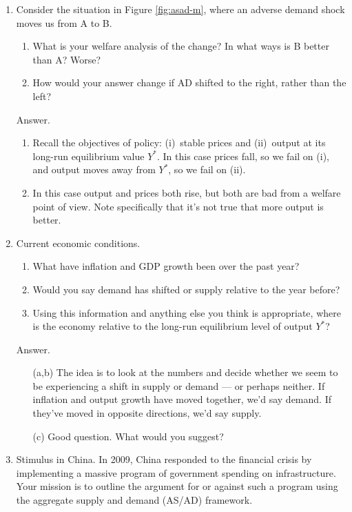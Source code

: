 \setlength{\leftmargini}{.5\oldleftmargini}
\begin{enumerate}
\item Consider the situation in Figure \ref{fig:asad-m},
where an adverse demand shock moves us from A to B.
\begin{enumerate}
\item What is your welfare analysis of the change?
In what ways is B better than A?  Worse?
\item How would your answer change if AD shifted to the right,
rather than the left?
\end{enumerate}

Answer.
\begin{enumerate}
\item Recall the objectives of policy:  (i)~stable prices
and (ii)~output at its long-run equilibrium value $Y^*$.
In this case prices fall, so we fail on (i), and output moves
away from $Y^*$, so we fail on (ii).
\item In this case output and prices both rise,
but both are bad from a welfare point of view.
Note specifically that it's not true that more output is better.
\end{enumerate}

\item Current economic conditions.
\begin{enumerate}
\item What have inflation and GDP growth been over the past year?
\item Would you say demand has shifted or supply relative to the year before?
\item Using this information and anything else you think is appropriate,
where is the economy relative to the long-run equilibrium level of output $Y^*$?
\end{enumerate}

Answer.
\begin{enumerate}
\item [(a,b)] The idea is to look at the numbers and decide whether
we seem to be experiencing a shift in supply or demand --- or perhaps neither.
If inflation and output growth have moved together, we'd say demand.
If they've moved in opposite directions, we'd say supply.

\item[(c)] Good question.  What would you suggest?
\end{enumerate}

\item Stimulus in China.
In 2009, China responded to the financial crisis by
implementing a massive program of government spending
on infrastructure.
Your mission is to outline the argument for or against such a program
using the aggregate supply and demand (AS/AD) framework.
%
\begin{enumerate}


\end{enumerate}
\end{enumerate}
